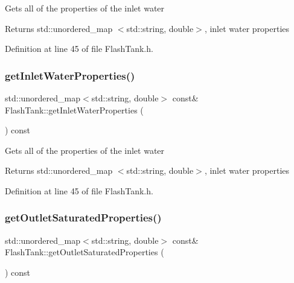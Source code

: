 Gets all of the properties of the inlet water \begin{DoxyReturn}{Returns}
std\+::unordered\+\_\+map $<$std\+::string, double$>$, inlet water properties 
\end{DoxyReturn}


Definition at line 45 of file Flash\+Tank.\+h.

\mbox{\label{class_flash_tank_a57a316e4ef448f4a9447b675ba6ac84b}} 
\subsubsection{\texorpdfstring{get\+Inlet\+Water\+Properties()}{getInletWaterProperties()}\hspace{0.1cm}{\footnotesize\ttfamily [3/3]}}
{\footnotesize\ttfamily std\+::unordered\+\_\+map$<$std\+::string, double$>$ const\& Flash\+Tank\+::get\+Inlet\+Water\+Properties (\begin{DoxyParamCaption}{ }\end{DoxyParamCaption}) const\hspace{0.3cm}{\ttfamily [inline]}}

Gets all of the properties of the inlet water \begin{DoxyReturn}{Returns}
std\+::unordered\+\_\+map $<$std\+::string, double$>$, inlet water properties 
\end{DoxyReturn}


Definition at line 45 of file Flash\+Tank.\+h.

\mbox{\label{class_flash_tank_aa22fdef56a1ad6d70beda66cc8a6940a}} 
\subsubsection{\texorpdfstring{get\+Outlet\+Saturated\+Properties()}{getOutletSaturatedProperties()}\hspace{0.1cm}{\footnotesize\ttfamily [1/3]}}
{\footnotesize\ttfamily std\+::unordered\+\_\+map$<$std\+::string, double$>$ const\& Flash\+Tank\+::get\+Outlet\+Saturated\+Properties (\begin{DoxyParamCaption}{ }\end{DoxyParamCaption}) const\hspace{0.3cm}{\ttfamily [inline]}}

